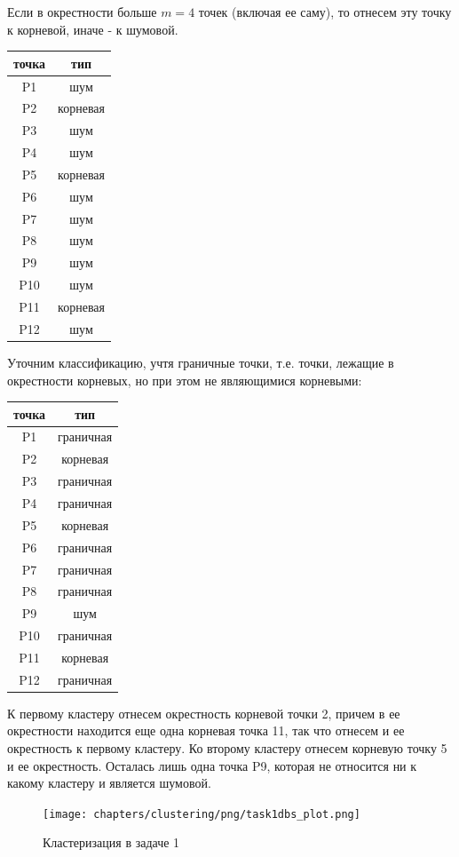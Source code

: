 Если в окрестности больше $m=4$ точек (включая ее саму), то отнесем эту точку к корневой, иначе - к шумовой.

\begin{center}
\begin{tabular}{ |c|c| } 
 \hline
 точка & тип \\\hline
 P1 & шум\\ 
 P2 & корневая\\ 
 P3 & шум\\ 
 P4 & шум\\
 P5 & корневая\\
 P6 & шум\\
 P7 & шум\\
 P8 & шум\\
 P9 & шум\\
 P10 & шум\\
 P11 & корневая\\
 P12 & шум\\
 \hline
\end{tabular}
\end{center}

Уточним классификацию, учтя граничные точки, т.е. точки, лежащие в окрестности корневых, но при этом не являющимися корневыми:
\begin{center}
\begin{tabular}{ |c|c| } 
 \hline
 точка & тип \\\hline
 P1 & граничная\\ 
 P2 & корневая\\ 
 P3 & граничная\\ 
 P4 & граничная\\
 P5 & корневая\\
 P6 & граничная\\
 P7 & граничная\\
 P8 & граничная\\
 P9 & шум\\
 P10 & граничная\\
 P11 & корневая\\
 P12 & граничная\\
 \hline
\end{tabular}
\end{center}

К первому кластеру отнесем окрестность корневой точки 2, причем в ее окрестности находится еще одна корневая точка 11, так что отнесем и ее окрестность к первому кластеру. Ко второму кластеру отнесем корневую точку 5 и ее окрестность. Осталась лишь одна точка P9, которая не относится ни к какому кластеру и является шумовой.
\begin{figure}[ht!]
    \centering
    \texttt{[image: chapters/clustering/png/task1dbs\_plot.png]}
    \caption{Кластеризация в задаче 1}
    \label{fig:task1dbs}
\end{figure}

